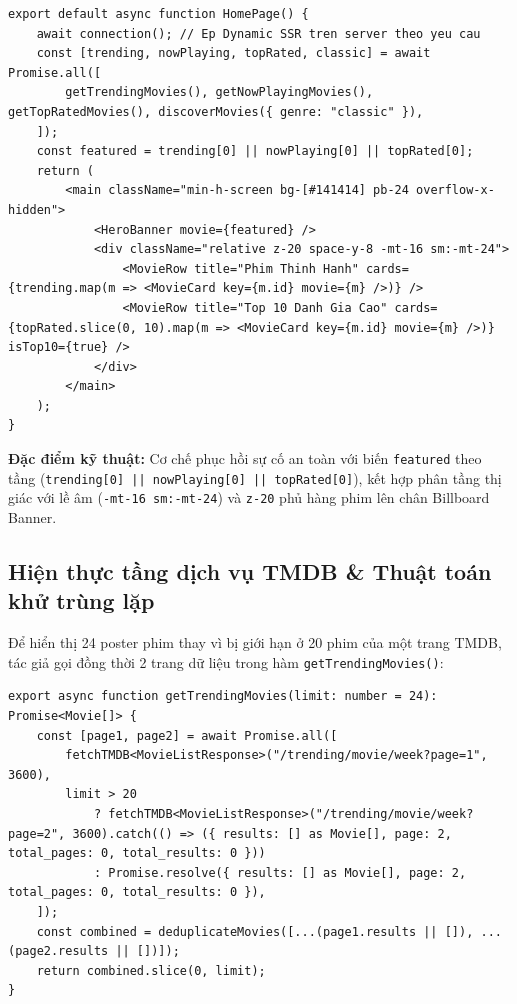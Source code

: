 \documentclass[12pt,a4paper]{extarticle}
\begin{document}
\begin{lstlisting}[caption={Server Component trang chủ song song hóa 4 luồng dữ liệu}]
export default async function HomePage() {
    await connection(); // Ep Dynamic SSR tren server theo yeu cau
    const [trending, nowPlaying, topRated, classic] = await Promise.all([
        getTrendingMovies(), getNowPlayingMovies(), getTopRatedMovies(), discoverMovies({ genre: "classic" }),
    ]);
    const featured = trending[0] || nowPlaying[0] || topRated[0];
    return (
        <main className="min-h-screen bg-[#141414] pb-24 overflow-x-hidden">
            <HeroBanner movie={featured} />
            <div className="relative z-20 space-y-8 -mt-16 sm:-mt-24">
                <MovieRow title="Phim Thinh Hanh" cards={trending.map(m => <MovieCard key={m.id} movie={m} />)} />
                <MovieRow title="Top 10 Danh Gia Cao" cards={topRated.slice(0, 10).map(m => <MovieCard key={m.id} movie={m} />)} isTop10={true} />
            </div>
        </main>
    );
}
\end{lstlisting}

\noindent \textbf{Đặc điểm kỹ thuật:} Cơ chế phục hồi sự cố an toàn với biến \texttt{featured} theo tầng (\texttt{trending[0] || nowPlaying[0] || topRated[0]}), kết hợp phân tầng thị giác với lề âm (\texttt{-mt-16 sm:-mt-24}) và \texttt{z-20} phủ hàng phim lên chân Billboard Banner.

\subsection{Hiện thực tầng dịch vụ TMDB \& Thuật toán khử trùng lặp}
Để hiển thị 24 poster phim thay vì bị giới hạn ở 20 phim của một trang TMDB, tác giả gọi đồng thời 2 trang dữ liệu trong hàm \texttt{getTrendingMovies()}:

\begin{lstlisting}[caption={Dịch vụ lấy phim thịnh hành kết hợp khử trùng lặp dữ liệu}]
export async function getTrendingMovies(limit: number = 24): Promise<Movie[]> {
    const [page1, page2] = await Promise.all([
        fetchTMDB<MovieListResponse>("/trending/movie/week?page=1", 3600),
        limit > 20
            ? fetchTMDB<MovieListResponse>("/trending/movie/week?page=2", 3600).catch(() => ({ results: [] as Movie[], page: 2, total_pages: 0, total_results: 0 }))
            : Promise.resolve({ results: [] as Movie[], page: 2, total_pages: 0, total_results: 0 }),
    ]);
    const combined = deduplicateMovies([...(page1.results || []), ...(page2.results || [])]);
    return combined.slice(0, limit);
}
\end{lstlisting}
\end{document}
